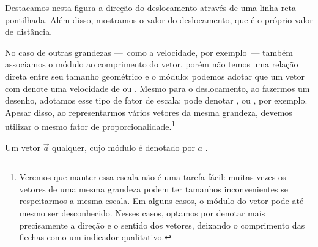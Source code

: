 \begin{marginfigure}
\centering
{}
\caption{Destacamos nesta figura a direção do deslocamento através de uma linha reta pontilhada. Além disso, mostramos o valor do deslocamento, que é o próprio valor de distância.\label{Fig:Deslocamento_eh_o_vetor_mais_simples}}
\end{marginfigure}

No caso de outras grandezas ---~como a velocidade, por exemplo~--- também associamos o módulo ao comprimento do vetor, porém não temos uma relação direta entre seu tamanho geométrico e o módulo: podemos adotar que um vetor com  denote uma velocidade de  ou . Mesmo para o deslocamento, ao fazermos um desenho, adotamos esse tipo de fator de escala:  pode denotar , ou , por exemplo. Apesar disso, ao representarmos vários vetores da mesma grandeza, devemos utilizar o mesmo fator de proporcionalidade.\footnote{Veremos que manter essa escala não é uma tarefa fácil: muitas vezes os vetores de uma mesma grandeza podem ter tamanhos inconvenientes se respeitarmos a mesma escala. Em alguns casos, o módulo do vetor pode até mesmo ser desconhecido. Nesses casos, optamos por denotar mais precisamente a direção e o sentido dos vetores, deixando o comprimento das flechas como um indicador qualitativo.}

\begin{marginfigure}
\centering
{}
\caption{Um vetor $\vec{a}$ qualquer, cujo módulo é denotado por $a$ .\label{Fig:vetor_simples_com_nome}}
\end{marginfigure}


